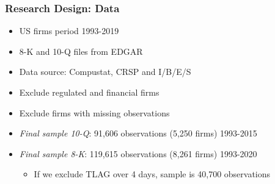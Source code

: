 \documentclass{beamer}
\begin{document}
\begin{frame}
\frametitle{Research Design: Data}

\begin{itemize}
	\item US firms period 1993-2019
	\item 8-K and 10-Q files from EDGAR
	\item Data source: Compustat, CRSP and I/B/E/S
	\item Exclude regulated and financial firms
	\item Exclude firms with missing observations

\medskip	\pause
	\item \textit{Final sample 10-Q}: 91,606	observations (5,250 firms) 1993-2015


\medskip	\pause
	\item \textit{Final sample 8-K}: 119,615	observations (8,261 firms) 1993-2020	
	\begin{itemize}
	\item If we exclude TLAG over 4 days, sample is 40,700 observations
	\end{itemize}
	
\end{itemize}
\end{frame}

	

\end{document}
